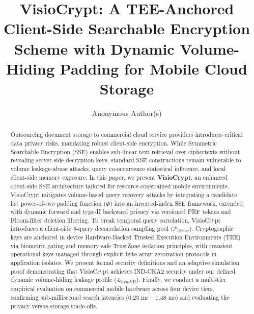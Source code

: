 \documentclass[runningheads]{llncs}
\begin{document}
\title{VisioCrypt: A TEE-Anchored Client-Side Searchable Encryption Scheme with Dynamic Volume-Hiding Padding for Mobile Cloud Storage}

\author{Anonymous Author(s)}

\maketitle

\begin{abstract}
Outsourcing document storage to commercial cloud service providers introduces critical data privacy risks, mandating robust client-side encryption. While Symmetric Searchable Encryption (SSE) enables sub-linear text retrieval over ciphertexts without revealing server-side decryption keys, standard SSE constructions remain vulnerable to volume leakage-abuse attacks, query co-occurrence statistical inference, and local client-side memory exposure. In this paper, we present \textbf{VisioCrypt}, an enhanced client-side SSE architecture tailored for resource-constrained mobile environments. VisioCrypt mitigates volume-based query recovery attacks by integrating a candidate list power-of-two padding function ($\Phi$) into an inverted-index SSE framework, extended with dynamic forward and type-II backward privacy via versioned PRF tokens and Bloom-filter deletion filtering. To break temporal query correlation, VisioCrypt introduces a client-side $\theta$-query decorrelation sampling pool ($\mathcal{P}_{\text{decorr}}$). Cryptographic keys are anchored in device Hardware-Backed Trusted Execution Environments (TEE) via biometric gating and memory-safe TrustZone isolation principles, with transient operational keys managed through explicit byte-array zeroization protocols in application isolates. We present formal security definitions and an adaptive simulation proof demonstrating that VisioCrypt achieves IND-CKA2 security under our defined dynamic volume-hiding leakage profile ($\mathcal{L}_{\text{dyn-VH}}$). Finally, we conduct a multi-tier empirical evaluation on commercial mobile hardware across four device tiers, confirming sub-millisecond search latencies ($0.23$ ms -- $1.48$ ms) and evaluating the privacy-versus-storage trade-offs.

\end{abstract}
\end{document}
